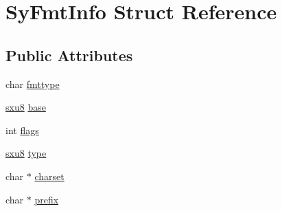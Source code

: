 \hypertarget{struct_sy_fmt_info}{\section{Sy\-Fmt\-Info Struct Reference}
\label{d9/db7/struct_sy_fmt_info}
}
\subsection*{Public Attributes}
\begin{DoxyCompactItemize}
\item 
char \hyperlink{struct_sy_fmt_info_afba298c0415421490f830cfbc86816ca}{fmttype}
\item 
\hyperlink{unqlite_8c_ad603950fcd99613e8ef4887422cde7a0}{sxu8} \hyperlink{struct_sy_fmt_info_a26e5a10d4048ba6804f12ba4fd632030}{base}
\item 
int \hyperlink{struct_sy_fmt_info_adc19d695ba16daeb2e86a782c0f2ec0d}{flags}
\item 
\hyperlink{unqlite_8c_ad603950fcd99613e8ef4887422cde7a0}{sxu8} \hyperlink{struct_sy_fmt_info_a6f5b00dfa6489fb31def05f16fdfbc70}{type}
\item 
char $\ast$ \hyperlink{struct_sy_fmt_info_a4743a7fd035362903618210eb5df764c}{charset}
\item 
char $\ast$ \hyperlink{struct_sy_fmt_info_a1c9cb49a751fd9f9dc31186d9544111a}{prefix}
\end{DoxyCompactItemize}


